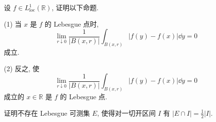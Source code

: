 \begin{exercise}\label{exer:3.9}
设 $f \in L_{\mathrm{loc}}^{1}(\mathbb{R})$, 证明以下命题.

(1) 当 $x$ 是 $f$ 的 Lebesgue 点时,
\[
\lim_{r \downarrow 0}\frac{1}{|B(x,r)|}\int_{B(x,r)}|f(y) - f(x)|\dd y = 0
\]
成立.

(2) 反之, 使
\[
\lim_{r \downarrow 0}\frac{1}{|B(x,r)|}\int_{B(x,r)}|f(y) - f(x)|\dd y = 0
\]
成立的 $x \in \mathbb{R}$ 是 $f$ 的 Lebesgue 点.
\end{exercise}

\begin{exercise}\label{exer:3.10}
证明不存在 Lebesgue 可测集 $E$, 使得对一切开区间 $I$ 有 $|E \cap I| = \frac{1}{2}|I|$.
\end{exercise}
